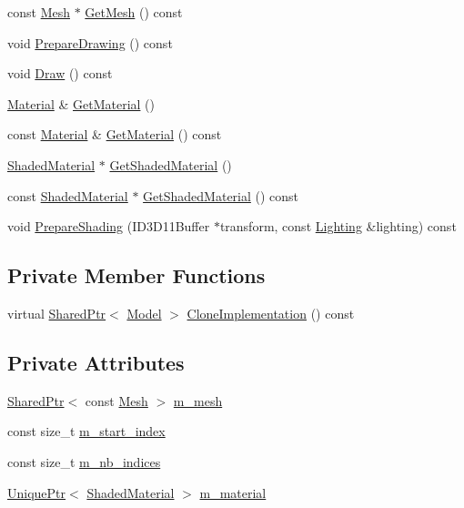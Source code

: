 \begin{DoxyCompactItemize}
const \hyperlink{classmage_1_1_mesh}{Mesh} $\ast$ \hyperlink{classmage_1_1_model_a085c12b33ebe60e7576c643e2d47baf0}{Get\+Mesh} () const
\item 
void \hyperlink{classmage_1_1_model_a0083c64e8199db23b78a9281be84685f}{Prepare\+Drawing} () const
\item 
void \hyperlink{classmage_1_1_model_a13badcd5e7bfaf8fbdc447dc211d5ad9}{Draw} () const
\item 
\hyperlink{structmage_1_1_material}{Material} \& \hyperlink{classmage_1_1_model_ae2d9b0fee188fe8f0377872bc2f8c2f6}{Get\+Material} ()
\item 
const \hyperlink{structmage_1_1_material}{Material} \& \hyperlink{classmage_1_1_model_aedb16dfea55edaefc3e5d88e9f9fa756}{Get\+Material} () const
\item 
\hyperlink{structmage_1_1_shaded_material}{Shaded\+Material} $\ast$ \hyperlink{classmage_1_1_model_af709f5b1ec136cbab25bda39e20e1662}{Get\+Shaded\+Material} ()
\item 
const \hyperlink{structmage_1_1_shaded_material}{Shaded\+Material} $\ast$ \hyperlink{classmage_1_1_model_a84af7ad13b2bc1d8a51828a62fbaa4b0}{Get\+Shaded\+Material} () const
\item 
void \hyperlink{classmage_1_1_model_a14cc836651dc3eeb378d749b24c149d9}{Prepare\+Shading} (I\+D3\+D11\+Buffer $\ast$transform, const \hyperlink{structmage_1_1_lighting}{Lighting} \&lighting) const
\end{DoxyCompactItemize}
\subsection*{Private Member Functions}
\begin{DoxyCompactItemize}
\item 
virtual \hyperlink{namespacemage_a1e01ae66713838a7a67d30e44c67703e}{Shared\+Ptr}$<$ \hyperlink{classmage_1_1_model}{Model} $>$ \hyperlink{classmage_1_1_model_af90feb622e30e1531983c01372b2df37}{Clone\+Implementation} () const
\end{DoxyCompactItemize}
\subsection*{Private Attributes}
\begin{DoxyCompactItemize}
\item 
\hyperlink{namespacemage_a1e01ae66713838a7a67d30e44c67703e}{Shared\+Ptr}$<$ const \hyperlink{classmage_1_1_mesh}{Mesh} $>$ \hyperlink{classmage_1_1_model_aecd2b4031c5df30fb5f7ed6d62810f73}{m\+\_\+mesh}
\item 
const size\+\_\+t \hyperlink{classmage_1_1_model_a63a3e697c9eb1606249de15cc7b818c3}{m\+\_\+start\+\_\+index}
\item 
const size\+\_\+t \hyperlink{classmage_1_1_model_a1fcf80ed9f3002bd2319ef83f073ae75}{m\+\_\+nb\+\_\+indices}
\item 
\hyperlink{namespacemage_a8c307fbcc33bce9b7f2aa4c26c3b95cf}{Unique\+Ptr}$<$ \hyperlink{structmage_1_1_shaded_material}{Shaded\+Material} $>$ \hyperlink{classmage_1_1_model_a93e080e5dc2c7c0672a278de76899122}{m\+\_\+material}
\end{DoxyCompactItemize}


